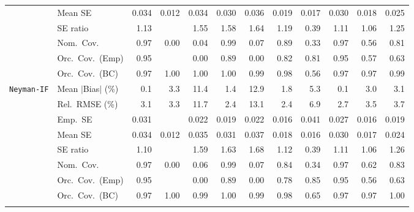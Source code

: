 \begin{landscape}
\begin{longtable}{llrrrrrrrrrr}
 & Mean SE & 0.034 & 0.012 & 0.034 & 0.030 & 0.036 & 0.019 & 0.017 & 0.030 & 0.018 & 0.025 \\
 & SE ratio & \cellcolor{rankthree}1.13 &  & 1.55 & 1.58 & 1.64 & 1.19 & 0.39 & \cellcolor{ranktwo}1.11 & \cellcolor{rankone}1.06 & 1.25 \\
 & Nom.\ Cov. & \cellcolor{rankone}0.97 & 0.00 & 0.04 & \cellcolor{ranktwo}0.99 & 0.07 & \cellcolor{rankthree}0.89 & 0.33 & \cellcolor{rankone}0.97 & 0.56 & 0.81 \\
 & Orc.\ Cov.\ (Emp) & \cellcolor{rankone}0.95 &  & 0.00 & \cellcolor{ranktwo}0.89 & 0.00 & \cellcolor{rankthree}0.82 & 0.81 & \cellcolor{rankone}0.95 & 0.57 & 0.63 \\
 & Orc.\ Cov.\ (BC) & \cellcolor{rankone}0.97 & 1.00 & 1.00 & 1.00 & \cellcolor{rankthree}0.99 & \cellcolor{ranktwo}0.98 & 0.56 & \cellcolor{rankone}0.97 & \cellcolor{rankone}0.97 & \cellcolor{rankthree}0.99 \\
\addlinespace[2pt]
\quad \texttt{Neyman-IF} & Mean $|$Bias$|$ (\%) & \cellcolor{rankone}0.1 & 3.3 & 11.4 & \cellcolor{ranktwo}1.4 & 12.9 & \cellcolor{rankthree}1.8 & 5.3 & \cellcolor{rankone}0.1 & 3.0 & 3.1 \\
 & Rel.\ RMSE (\%) & \cellcolor{rankthree}3.1 & 3.3 & 11.7 & \cellcolor{rankone}2.4 & 13.1 & \cellcolor{rankone}2.4 & 6.9 & \cellcolor{ranktwo}2.7 & 3.5 & 3.7 \\
 & Emp.\ SE & 0.031 &  & 0.022 & 0.019 & 0.022 & 0.016 & 0.041 & 0.027 & 0.016 & 0.019 \\
 & Mean SE & 0.034 & 0.012 & 0.035 & 0.031 & 0.037 & 0.018 & 0.016 & 0.030 & 0.017 & 0.024 \\
 & SE ratio & \cellcolor{ranktwo}1.10 &  & 1.59 & 1.63 & 1.68 & 1.12 & 0.39 & \cellcolor{rankthree}1.11 & \cellcolor{rankone}1.06 & 1.26 \\
 & Nom.\ Cov. & \cellcolor{rankone}0.97 & 0.00 & 0.06 & \cellcolor{ranktwo}0.99 & 0.07 & \cellcolor{rankthree}0.84 & 0.34 & \cellcolor{rankone}0.97 & 0.62 & 0.83 \\
 & Orc.\ Cov.\ (Emp) & \cellcolor{rankone}0.95 &  & 0.00 & \cellcolor{ranktwo}0.89 & 0.00 & 0.78 & \cellcolor{rankthree}0.85 & \cellcolor{rankone}0.95 & 0.56 & 0.63 \\
 & Orc.\ Cov.\ (BC) & \cellcolor{rankone}0.97 & 1.00 & \cellcolor{rankthree}0.99 & 1.00 & \cellcolor{rankthree}0.99 & \cellcolor{ranktwo}0.98 & 0.65 & \cellcolor{rankone}0.97 & \cellcolor{rankone}0.97 & 1.00 \\
\addlinespace[2pt]
\multicolumn{12}{l}{\textbf{Binary \& Categorical Phase-One Covariates}} \\

\end{longtable}
\end{landscape}
